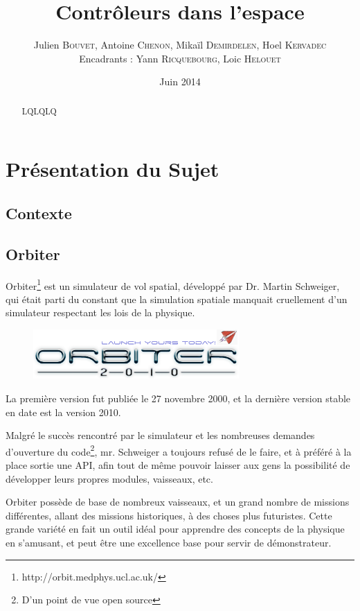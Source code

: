 \documentclass[a4paper,11pt]{article}
\title{\textbf{Contrôleurs dans l'espace}}
\author{Julien \textsc{Bouvet}, Antoine \textsc{Chenon}, Mikaïl \textsc{Demirdelen}, Hoel \textsc{Kervadec}
        \\
        Encadrants : Yann \textsc{Ricquebourg}, Loic \textsc{Helouet}}
\date{Juin 2014}
\begin{document}
\thispagestyle{empty}

\maketitle
\begin{abstract}
LQLQLQ
\end{abstract}

\section{Présentation du Sujet}
    \subsection{Contexte}

    \subsection{Orbiter}
        Orbiter\footnote{http://orbit.medphys.ucl.ac.uk/} est un simulateur de vol spatial, développé par Dr. Martin Schweiger, qui était parti du constant que la simulation spatiale manquait cruellement d'un simulateur respectant les lois de la physique.

        \begin{figure}[!h]
            \begin{center}
                \includegraphics[width=0.7\textwidth]{img/orbiter_logo.png}
            \end{center}
        \end{figure}

        La première version fut publiée le 27 novembre 2000, et la dernière version stable en date est la version 2010.

        Malgré le succès rencontré par le simulateur et les nombreuses demandes d'ouverture du code\footnote{D'un point de vue open source}, mr. Schweiger a toujours refusé de le faire, et à préféré à la place sortie une API, afin tout de même pouvoir laisser aux gens la possibilité de développer leurs propres modules, vaisseaux, etc.

        Orbiter possède de base de nombreux vaisseaux, et un grand nombre de missions différentes, allant des missions historiques, à des choses plus futuristes. Cette grande variété en fait un outil idéal pour apprendre des concepts de la physique en s'amusant, et peut être une excellence base pour servir de démonstrateur.
\end{document}

